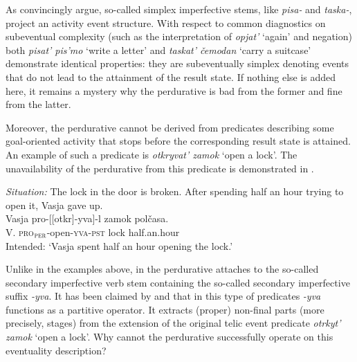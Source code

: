 \documentclass[output=paper,
]{langscibook}
\begin{document}
\z

\z

\noindent As \citet{pazelskaya2006} convincingly argue, so-called simplex imperfective stems, like \textit{pisa-} and \textit{taska-}, project an activity event structure. With respect to common diagnostics on subeventual complexity (such as the interpretation of \textit{opjat’} `again' and negation) both \textit{pisat’ pis’mo} `write a letter' and \textit{taskat’ čemodan} `carry a suitcase'
 demonstrate identical properties: they are subeventually simplex denoting events that do not lead to the attainment of the result state. If nothing else is added here, it remains a mystery why the perdurative is bad from the former and fine from the latter.

Moreover, the perdurative cannot be derived from predicates describing some goal-oriented activity that stops before the corresponding result state is attained. An example of such a predicate is \textit{otkryvat' zamok} `open a lock'. The unavailability of the perdurative from this predicate is demonstrated in .

\ea \textit{Situation:} The lock in the door is broken. After spending half an hour trying to open it, Vasja gave up.\medskip\\ 
\gll *\hspace{-2pt} Vasja		pro-[[otkr]-yva]-l		zamok		polčasa.\\    
     {} V.
     \textsc{pro}$_\textsc{per}$-open-\textsc{yva}-\textsc{pst}	lock		half.an.hour\\ 
\glt Intended: `Vasja spent half an hour opening the lock.' \label{ex:naumov:4}
\z

\noindent Unlike in the examples above, in  the perdurative attaches to the so-called secondary imperfective verb stem containing the so-called secondary imperfective suffix \textit{-yva}. It has been claimed by \citet{altshuler2013,altshuler2014} and \citet{tatevosov2017temporal} that in this type of predicates \textit{-yva} functions as a partitive operator. It extracts (proper) non-final parts (more precisely, stages) from the extension of the original telic event predicate \textit{otrkyt’ zamok} `open a lock'. Why cannot the perdurative successfully operate on this eventuality description?
\end{document}
